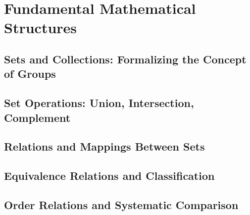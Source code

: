 

\chapter{Fundamental Mathematical Structures}

\section{Sets and Collections: Formalizing the Concept of Groups}

\section{Set Operations: Union, Intersection, Complement}

\section{Relations and Mappings Between Sets}

\section{Equivalence Relations and Classification}

\section{Order Relations and Systematic Comparison}
